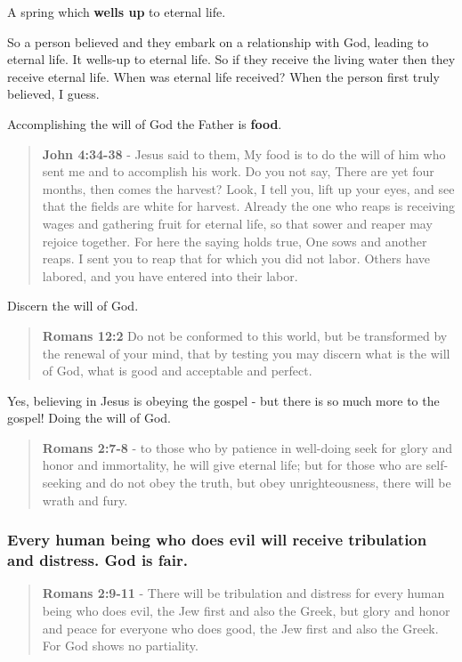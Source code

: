 \documentclass[11pt]{article}
\begin{document}
A spring which \textbf{wells up} to eternal life.

So a person believed and they embark on a relationship with God, leading to eternal life.
It wells-up to eternal life. So if they receive the living water then they receive eternal life.
When was eternal life received? When the person first truly believed, I guess.

Accomplishing the will of God the Father is \textbf{food}.

\begin{quote}
\textbf{John 4:34-38} - Jesus said to them, My food is to do the will of him who sent me and to accomplish his work. Do you not say, There are yet four months, then comes the harvest? Look, I tell you, lift up your eyes, and see that the fields are white for harvest. Already the one who reaps is receiving wages and gathering fruit for eternal life, so that sower and reaper may rejoice together. For here the saying holds true, One sows and another reaps. I sent you to reap that for which you did not labor. Others have labored, and you have entered into their labor.
\end{quote}

Discern the will of God.

\begin{quote}
\textbf{Romans 12:2} Do not be conformed to this world, but be transformed by the renewal of your mind, that by testing you may discern what is the will of God, what is good and acceptable and perfect.
\end{quote}

Yes, believing in Jesus is obeying the gospel - but there is so much more to the gospel! Doing the will of God.

\begin{quote}
\textbf{Romans 2:7-8} - to those who by patience in well-doing seek for glory and honor and immortality, he will give eternal life; but for those who are self-seeking and do not obey the truth, but obey unrighteousness, there will be wrath and fury.
\end{quote}

\subsubsection{Every human being who does evil will receive tribulation and distress. God is fair.}
\label{sec:orga80a98f}
\begin{quote}
\textbf{Romans 2:9-11} - There will be tribulation and distress for every human being who does evil, the Jew first and also the Greek, but glory and honor and peace for everyone who does good, the Jew first and also the Greek. For God shows no partiality.
\end{quote}
\end{document}
